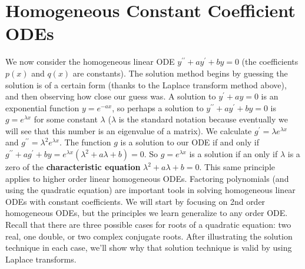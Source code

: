 \section{Homogeneous Constant Coefficient ODEs}
We now consider the homogeneous linear ODE $y^{\prime\prime}+ay^\prime+by=0$ (the coefficients $p(x)$ and $q(x)$ are constants). The solution method begins by guessing the solution is of a certain form (thanks to the Laplace transform method above), and then observing how close our guess was. A solution to $y^\prime + ay=0$ is an exponential function $y=e^{-ax}$, so perhaps a solution to  $y^{\prime\prime}+ay^\prime+by=0$ is $g=e^{\lambda x}$ for some constant $\lambda$ ($\lambda$ is the standard notation because eventually we will see that this number is an eigenvalue of a matrix).  We calculate $g^\prime = \lambda e^{\lambda x}$ and $g^{\prime\prime} = \lambda^2 e^{\lambda x}$.  The function $g$ is a solution to our ODE if and only if $g^{\prime\prime}+ag^\prime+by=e^{\lambda x}(\lambda^2+a\lambda+b)=0$. So $g=e^{\lambda x}$ is a solution if an only if $\lambda$ is a zero of the \textbf{characteristic equation} $\lambda^2+a\lambda+b=0$. This same principle applies to higher order linear homogeneous ODEs. Factoring polynomials (and using the quadratic equation) are important tools in solving homogeneous linear ODEs with constant coefficients. We will start by focusing on 2nd order homogeneous ODEs, but the principles we learn generalize to any order ODE. Recall that there are three possible cases for roots of a quadratic equation: two real, one double, or two complex conjugate roots. After illustrating the solution technique in each case, we'll show why that solution technique is valid by using Laplace transforms.



